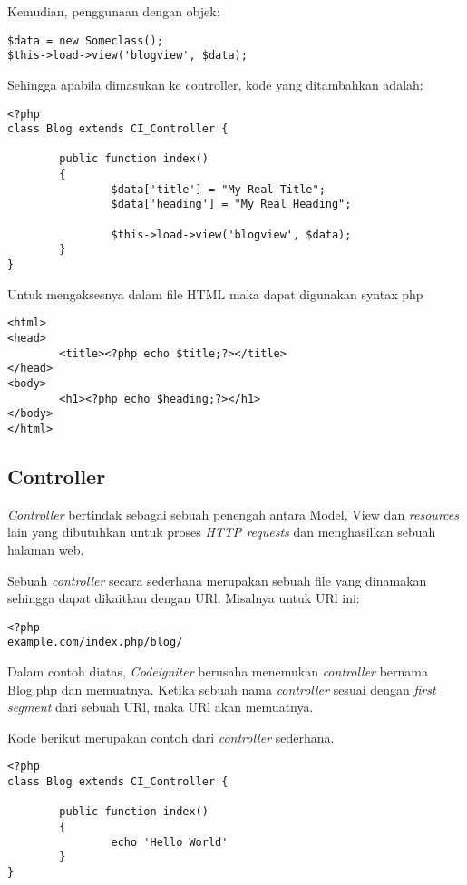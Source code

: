 Kemudian, penggunaan dengan objek:
\begin{lstlisting}[frame=single] 
$data = new Someclass();
$this->load->view('blogview', $data);
\end{lstlisting}

Sehingga apabila dimasukan ke controller, kode yang ditambahkan adalah:
\begin{lstlisting}[frame=single] 
<?php
class Blog extends CI_Controller {

        public function index()
        {
                $data['title'] = "My Real Title";
                $data['heading'] = "My Real Heading";

                $this->load->view('blogview', $data);
        }
}
\end{lstlisting}

Untuk mengaksesnya dalam file HTML maka dapat digunakan syntax php
\begin{lstlisting}[frame=single] 
<html>
<head>
        <title><?php echo $title;?></title>
</head>
<body>
        <h1><?php echo $heading;?></h1>
</body>
</html>
\end{lstlisting}

\subsection{Controller}
\label{subs:controller}
\textit{Controller} bertindak sebagai sebuah penengah antara Model, View dan \textit{resources} lain yang dibutuhkan untuk proses \textit{HTTP requests} dan menghasilkan sebuah halaman web.

Sebuah \textit{controller} secara sederhana merupakan sebuah file yang dinamakan sehingga dapat dikaitkan dengan URl.\cite{codeigniter:17}
Misalnya untuk URl ini:
\begin{lstlisting}[frame=single] 
<?php
example.com/index.php/blog/
\end{lstlisting}

Dalam contoh diatas, \textit{Codeigniter} berusaha menemukan \textit{controller} bernama Blog.php dan memuatnya. Ketika sebuah nama \textit{controller} sesuai dengan \textit{first segment} dari sebuah URl, maka URl akan memuatnya.\cite{codeigniter:17}

Kode berikut merupakan contoh dari \textit{controller} sederhana.
\begin{lstlisting}[frame=single] 
<?php
class Blog extends CI_Controller {

        public function index()
        {
                echo 'Hello World'
        }
}
\end{lstlisting} 

